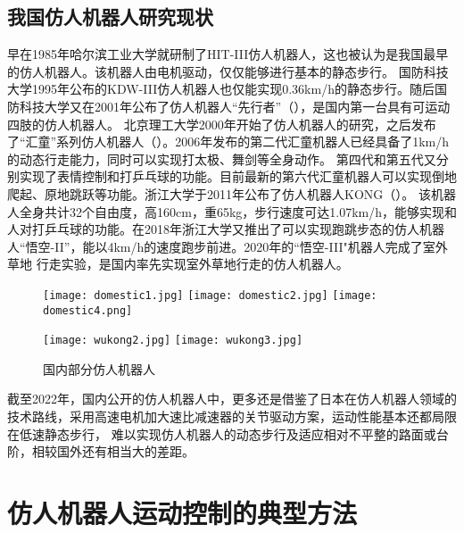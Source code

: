 \subsection{我国仿人机器人研究现状}
早在1985年哈尔滨工业大学就研制了HIT-III仿人机器人，这也被认为是我国最早的仿人机器人\cite{谢涛2002}。该机器人由电机驱动，仅仅能够进行基本的静态步行。
国防科技大学1995年公布的KDW-III仿人机器人也仅能实现0.36km/h的静态步行。随后国防科技大学又在2001年公布了仿人机器人“先行者”（），是国内第一台具有可运动四肢的仿人机器人。
北京理工大学2000年开始了仿人机器人的研究，之后发布了“汇童”系列仿人机器人（）。2006年发布的第二代汇童机器人已经具备了1km/h的动态行走能力，同时可以实现打太极、舞剑等全身动作。
第四代和第五代又分别实现了表情控制和打乒乓球的功能。目前最新的第六代汇童机器人可以实现倒地爬起、原地跳跃等功能\cite{huang2019historical}。浙江大学于2011年公布了仿人机器人KONG\cite{sun2011balance}（）。
该机器人全身共计32个自由度，高160cm，重65kg，步行速度可达1.07km/h，能够实现和人对打乒乓球的功能。在2018年浙江大学又推出了可以实现跑跳步态的仿人机器人“悟空-II”，能以4km/h的速度跑步前进。2020年的“悟空-III"机器人完成了室外草地
行走实验，是国内率先实现室外草地行走的仿人机器人。
\begin{figure}[htbp]
    \centering
        {%
            \texttt{[image: domestic1.jpg]}}
        {%
            \texttt{[image: domestic2.jpg]}}
        {%
            \texttt{[image: domestic4.png]}}     
    
        {%
            \texttt{[image: wukong2.jpg]}}
        {%
            \texttt{[image: wukong3.jpg]}}            
    \caption{国内部分仿人机器人\label{fig:domes_biped}}
\end{figure}
截至2022年，国内公开的仿人机器人中，更多还是借鉴了日本在仿人机器人领域的技术路线，采用高速电机加大速比减速器的关节驱动方案，运动性能基本还都局限在低速静态步行，
难以实现仿人机器人的动态步行及适应相对不平整的路面或台阶，相较国外还有相当大的差距。
\section{仿人机器人运动控制的典型方法}
